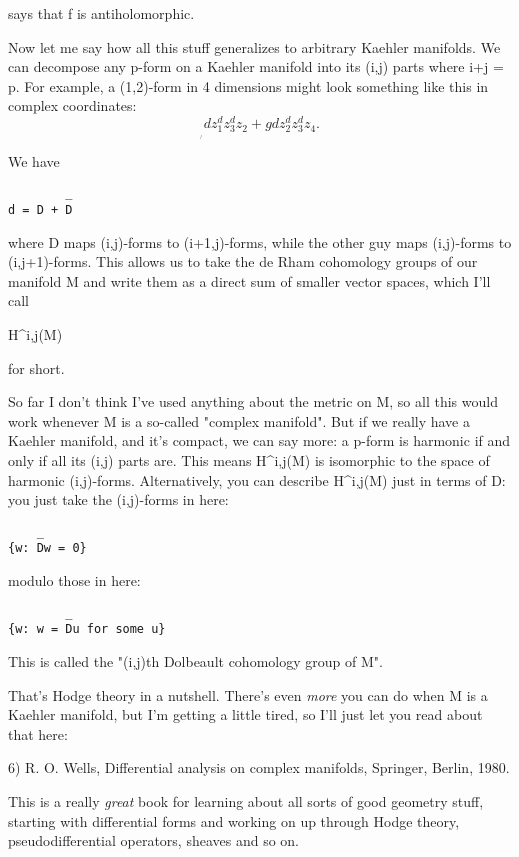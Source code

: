 says that f is antiholomorphic.  

Now let me say how all this stuff generalizes to arbitrary Kaehler
manifolds.  We can decompose any p-form on a Kaehler manifold into
its (i,j) parts where i+j = p.  For example, a (1,2)-form
in 4 dimensions might look something like this in complex coordinates:
$$
    ^{ }    _ ^{ }   _     ^{  }        _ ^{ }   _
f dz_{1} ^ dz_{3} ^ dz_{2}  +  g dz_{2} ^ dz_{3} ^ dz_{4}.
$$
    
We have
\begin{verbatim}
        _
d = D + D
\end{verbatim}
    
where D maps (i,j)-forms to (i+1,j)-forms, while the other guy maps
(i,j)-forms to (i,j+1)-forms.  This allows us to take the de Rham
cohomology groups of our manifold M and write them as a direct sum of
smaller vector spaces, which I'll call

H^{i,j}(M) 

for short.  

So far I don't think I've used anything about the metric on M, so all
this would work whenever M is a so-called "complex manifold".
But if we really have a Kaehler manifold, and it's compact, we can say
more: a p-form is harmonic if and only if all its (i,j) parts are.  This
means H^{i,j}(M) is isomorphic to the space of harmonic
(i,j)-forms.  Alternatively, you can describe H^{i,j}(M) just
in terms of D: you just take the (i,j)-forms in here: 

\begin{verbatim}
    _
{w: Dw = 0}
\end{verbatim}
    
modulo those in here:
\begin{verbatim}
        _
{w: w = Du for some u}
\end{verbatim}
    
This is called the "(i,j)th Dolbeault cohomology group of M".

That's Hodge theory in a nutshell.  There's even \emph{more} you can
do when M is a Kaehler manifold, but I'm getting a little tired,
so I'll just let you read about that here:

6) R. O. Wells, Differential analysis on complex manifolds, 
Springer, Berlin, 1980.

This is a really \emph{great} book for learning about all sorts of good
geometry stuff, starting with differential forms and working on up
through Hodge theory, pseudodifferential operators, sheaves and so on.

